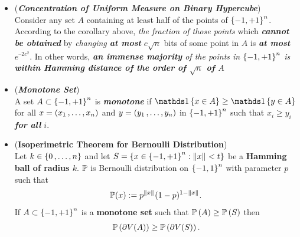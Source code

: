 \documentclass[11pt]{article}
\begin{document}
\begin{itemize}
\item \begin{remark} (\textbf{\emph{Concentration of Uniform Measure on Binary Hypercube}})\\
Consider any set $A$ containing at least half of the points of $\left\{-1, +1\right\}^n$. According to the corollary above, \emph{the fraction of those points} which \emph{\textbf{cannot be obtained}} by \emph{changing \textbf{at most}} $c\sqrt{n}$ bits of some point in $A$ is \emph{\textbf{at most}} $e^{–2c^2}$. In other words, \emph{\textbf{an immense majority} of the points in $\left\{-1, +1\right\}^n$ is \textbf{within Hamming distance of the order of $\sqrt{n}$ of $A$}}
\end{remark}

\item \begin{definition} (\emph{\textbf{Monotone Set}})\\
A set $A \subset \left\{-1, +1\right\}^n$  is \emph{\textbf{monotone}} if $\ind{x \in A} \ge \ind{y \in A}$ for all $x = (x_1 \,{,}\ldots{,}\, x_n)$ and $y = (y_1 \,{,}\ldots{,}\, y_n)$ in $\left\{-1, +1\right\}^n$ such that $x_i \ge y_i$ \emph{\textbf{for all} $i$}. 
\end{definition}

\item \begin{theorem}  (\textbf{Isoperimetric Theorem for Bernoulli Distribution}) \citep{boucheron2013concentration}\\
Let $k \in \left\{0 \,{,}\ldots{,}\, n\right\}$ and let $S = \left\{x \in \left\{-1, +1\right\}^n:  \left\|x\right\|_{} < t\right\}$ be a \textbf{Hamming ball of radius $k$}. ${\mathbb P}$ is Bernoulli distribution on $\left\{-1, 1\right\}^n$ with parameter $p$ such that 
\begin{align*}
{\mathbb P}(x) := p^{\left\|x\right\|_{}}(1- p)^{1- \left\|x\right\|_{}}.
\end{align*}
If $A \subset \left\{-1, +1\right\}^n$ is a \textbf{monotone set} such that ${\mathbb P}\left(A\right) \ge {\mathbb P}\left(S\right)$ then
\begin{align*}
{\mathbb P}\left(\partial V(A)\right)\ge {\mathbb P}\left(\partial V(S)\right).
\end{align*}
\end{theorem}
\end{itemize}







\newpage


\end{document}
